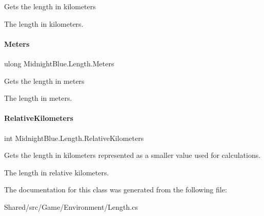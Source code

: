 Gets the length in kilometers 

The length in kilometers.\hypertarget{class_midnight_blue_1_1_length_ac824fa58d75ab754c33cdc8bfd49e5b0}{}\label{class_midnight_blue_1_1_length_ac824fa58d75ab754c33cdc8bfd49e5b0} 
\paragraph{\texorpdfstring{Meters}{Meters}}
{\footnotesize\ttfamily ulong Midnight\+Blue.\+Length.\+Meters\hspace{0.3cm}{\ttfamily [get]}}



Gets the length in meters 

The length in meters.\hypertarget{class_midnight_blue_1_1_length_a7073632b5e2dfc836266de44378941be}{}\label{class_midnight_blue_1_1_length_a7073632b5e2dfc836266de44378941be} 
\paragraph{\texorpdfstring{Relative\+Kilometers}{RelativeKilometers}}
{\footnotesize\ttfamily int Midnight\+Blue.\+Length.\+Relative\+Kilometers\hspace{0.3cm}{\ttfamily [get]}}



Gets the length in kilometers represented as a smaller value used for calculations. 

The length in relative kilometers.

The documentation for this class was generated from the following file\+:\begin{DoxyCompactItemize}
\item 
Shared/src/\+Game/\+Environment/Length.\+cs\end{DoxyCompactItemize}
